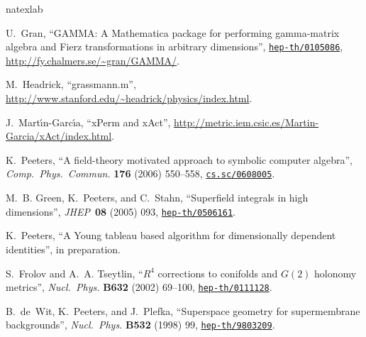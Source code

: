 \documentclass[11pt]{article}
\begin{document}
\begingroup\raggedright\begin{thebibliography}{8}
\expandafter\ifx\csname natexlab\endcsname\relax\def\natexlab#1{#1}\fi

U.~Gran, ``{GAMMA}: A {Mathematica} package for performing gamma-matrix algebra
  and {Fierz} transformations in arbitrary dimensions'',
  \href{http://xxx.lanl.gov/abs/hep-th/0105086}{{\tt hep-th/0105086}},
\url{http://fy.chalmers.se/~gran/GAMMA/}.

M.~Headrick, ``grassmann.m'',
  \url{http://www.stanford.edu/~headrick/physics/index.html}.

J.~{Mart\'\i{}n-Garc\'\i{}a}, ``{xPerm and xAct}'',
  \url{http://metric.iem.csic.es/Martin-Garcia/xAct/index.html}.

K.~Peeters, ``A field-theory motivated approach to symbolic computer algebra'',
  {\em Comp.\ Phys.\ Commun.} {\bf 176} (2006) 550--558,
  \href{http://xxx.lanl.gov/abs/cs.sc/0608005}{{\tt cs.sc/0608005}}.

M.~B. Green, K.~Peeters, and C.~Stahn, ``Superfield integrals in high
  dimensions'', {\em JHEP\,} {\bf 08} (2005) 093,
\href{http://xxx.lanl.gov/abs/hep-th/0506161}{{\tt hep-th/0506161}}.

K.~Peeters, ``A {Young} tableau based algorithm for dimensionally dependent
  identities'', in preparation.

S.~Frolov and A.~A. Tseytlin, ``{$R^4$ corrections to conifolds and $G(2)$
  holonomy metrics}'', {\em Nucl.\ Phys.} {\bf B632} (2002) 69--100,
\href{http://xxx.lanl.gov/abs/hep-th/0111128}{{\tt hep-th/0111128}}.

B.~de~Wit, K.~Peeters, and J.~Plefka, ``Superspace geometry for supermembrane
  backgrounds'', {\em Nucl.\ Phys.} {\bf B532} (1998) 99,
\href{http://xxx.lanl.gov/abs/hep-th/9803209}{{\tt hep-th/9803209}}.

\end{thebibliography}\endgroup
\end{document}
